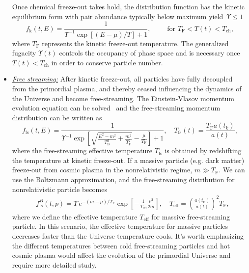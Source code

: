 \begin{itemize}
Once chemical freeze-out takes hold, the distribution function has the kinetic equilibrium form with pair abundance typically below maximum yield~$\Upsilon \le 1$
\begin{equation}\label{kinetic_equilib}
f_\mathrm{k}(t,E)=\frac{1}{\Upsilon^{-1}\exp[(E-\mu)/T]+1},\qquad \text{ for }T_\mathrm{F}< T(t)< T_\mathrm{ch},
\end{equation}
where $T_\mathrm{F}$ represents the kinetic freeze-out temperature. The generalized fugacity $\Upsilon(t)$ controls the occupancy of phase space and is necessary once $T(t)<T_\mathrm{ch}$ in order to conserve particle number.
%
\item \underline{\it Free streaming:\/}
After kinetic freeze-out, all particles have fully decoupled from the primordial plasma, and thereby ceased influencing the dynamics of the Universe and become free-streaming. The Einstein-Vlasov momentum evolution equation can be solved~\cite{Choquet-Bruhat:2009xil} and the free-streaming momentum distribution can be written as~\cite{Birrell:2012gg}
\begin{equation}\label{freeStreamDist}
f_\mathrm{fs}(t,E)=\frac{1}{\Upsilon^{-1}\exp{\left[\sqrt{\frac{E^2-m^2}{T_\mathrm{fs}^2}+\frac{m^2}{T^2_\mathrm{F}}}-\frac{\mu}{T_\mathrm{F}}\right]+1}},\quad T_\mathrm{fs}(t)=\frac{T_\mathrm{F}a(t_k)}{a(t)},
\end{equation}
where the free-streaming effective temperature $T_\mathrm{fs}$ is obtained by redshifting the temperature at kinetic freeze-out. If a massive particle (e.g. dark matter) freeze-out from cosmic plasma in the nonrelativistic regime, $m\gg T_\mathrm{F}$. We can use the
Boltzmann approximation, and the free-streaming distribution for nonrelativistic particle becomes
\begin{align}
&f^B_\mathrm{fs}(t,p)=\Upsilon\,e^{-(m+\mu)/T_\mathrm{F}}\exp\left[-\frac{1}{ T_\mathrm{eff}}\frac{p^2}{2m}\right],\quad T_\mathrm{eff}=\left(\frac{a(t_\mathrm{F})}{a(t)}\right)^2T_\mathrm{F},
\end{align}
where we define the effective temperature $T_\mathrm{eff}$ for massive free-streaming particle. In this scenario, the effective temperature for massive particles decreases faster than the Universe temperature cools. It's worth emphasizing the different temperatures between cold free-streaming particles and hot cosmic plasma would affect the evolution of the primordial Universe and require more detailed study. 
\end{itemize}


